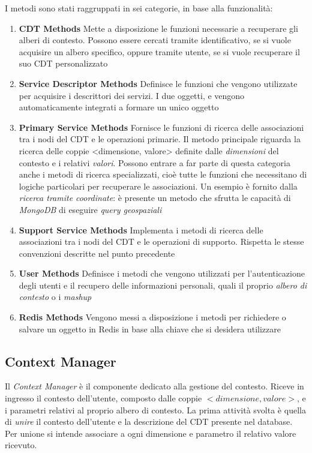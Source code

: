 I metodi sono stati raggruppati in sei categorie, in base alla funzionalità:

\begin{enumerate}
	\item \textbf{CDT Methods}
	Mette a disposizione le funzioni necessarie a recuperare gli alberi di contesto. Possono essere cercati tramite identificativo, se si vuole acquisire un albero specifico, oppure tramite utente, se si vuole recuperare il suo CDT personalizzato
	\item \textbf{Service Descriptor Methods}
	Definisce le funzioni che vengono utilizzate per acquisire i descrittori dei servizi. I due oggetti,  e  vengono automaticamente integrati a formare un unico oggetto
	\item \textbf{Primary Service Methods}
	Fornisce le funzioni di ricerca delle associazioni tra i nodi del CDT e le operazioni primarie. Il metodo principale riguarda la ricerca delle coppie {<}dimensione, valore{>} definite dalle \emph{dimensioni} del contesto e i relativi \emph{valori}. Possono entrare a far parte di questa categoria anche i metodi di ricerca specializzati, cioè tutte le funzioni che necessitano di logiche particolari per recuperare le associazioni. Un esempio è fornito dalla \emph{ricerca tramite coordinate}: è presente un metodo che sfrutta le capacità di \emph{MongoDB} di eseguire \emph{query geospaziali}
	\item \textbf{Support Service Methods}
	Implementa i metodi di ricerca delle associazioni tra i nodi del CDT e le operazioni di supporto. Rispetta le stesse convenzioni descritte nel punto precedente
	\item \textbf{User Methods}
	Definisce i metodi che vengono utilizzati per l'autenticazione degli utenti e il recupero delle informazioni personali, quali il proprio \emph{albero di contesto} o i \emph{mashup}
	\item \textbf{Redis Methods}
	Vengono messi a disposizione i metodi per richiedere o salvare un oggetto in Redis in base alla chiave che si desidera utilizzare
\end{enumerate}

\subsection{Context Manager\label{sec:context-manager}}

Il \emph{Context Manager} è il componente dedicato alla gestione del contesto. Riceve in ingresso il contesto dell'utente, composto dalle coppie $ {<}dimensione, valore{>} $, e i parametri relativi al proprio albero di contesto. La prima attività svolta è quella di \emph{unire} il contesto dell'utente e la descrizione del CDT presente nel database. Per unione si intende associare a ogni dimensione e parametro il relativo valore ricevuto.

